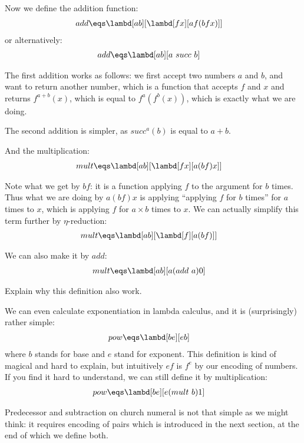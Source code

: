 \documentclass[../../../include/open-logic-section]{subfiles}
\begin{document}
Now we define the addition function:
\begin{align*}
  {add} &\eqs \lambd[{a}{b}][\lambd[fx][{a} f ({b} f x)]]
\end{align*}
or alternatively:
\begin{align*}
  {add} &\eqs \lambd[{a}{b}][{a} ~ {succ} ~ {b}]
\end{align*}

The first addition works as follows: we first accept two numbers ${a}$ and
${b}$, and want to return another number, which is a function that accepts
$f$ and $x$ and returns $f^{a+b}(x)$, which is equal to
$f^{a}(f^{b}(x))$, which is exactly what we are doing.

The second addition is simpler, as $succ^a(b)$ is equal to ${a + b}$.

And the multiplication:
\begin{align*}
  {mult} &\eqs \lambd[{a}{b}][\lambd[fx][{a} ({b} f) x]]
\end{align*}

Note what we get by ${b} f$: it is a function applying $f$
to the argument for $b$ times. Thus what we are doing by ${a} ({b} f) x$ is applying ``applying
$f$ for $b$ times'' for $a$ times to $x$, which is applying $f$ for $a
\times b$ times to $x$. We can actually simplify this term further by
$\eta$-reduction:
\begin{align*}
  {mult} &\eqs \lambd[ab][\lambd[f][a (b f)]]
\end{align*}

We can also make it by $add$:
\begin{align*}
  {mult} &\eqs \lambd[ab][a (add ~ a) 0]
\end{align*}

\begin{prob}
  Explain why this definition also work.
\end{prob}

We can even calculate exponentiation in lambda calculus, and it is
(surprisingly) rather simple:
\begin{align*}
  {pow} &\eqs \lambd[be][e b]
\end{align*}
where $b$ stands for base and $e$ stand for exponent. 
This definition is kind of magical and hard to explain, but
intuitively $e f$ is $f^e$ by our encoding of numbers. If you find it
hard to understand, we can still define it by multiplication:
\begin{align*}
  {pow} &\eqs \lambd[be][e ({mult}~ b) 1]
\end{align*}

Predecessor and subtraction on church numeral is not that simple as we might think: it
requires encoding of pairs which is introduced in the next section,
at the end of which we define both.
\end{document}
